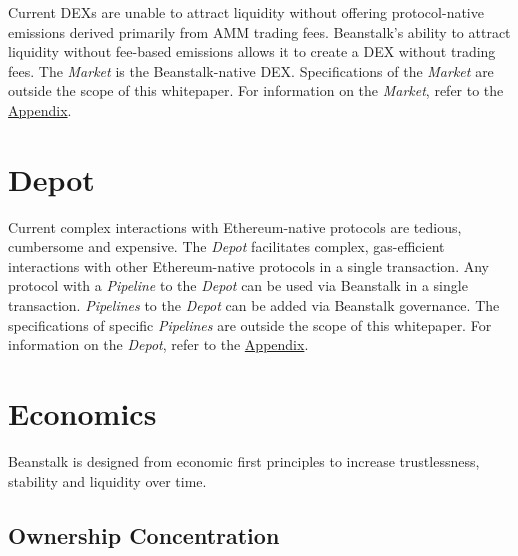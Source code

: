\documentclass[tikz]{article}
\newcommand{\term}[1]{\textsl{#1}}
\begin{document}
Current DEXs are unable to attract liquidity without offering protocol-native emissions derived primarily from AMM trading fees. Beanstalk's ability to attract liquidity without fee-based emissions allows it to create a DEX without trading fees. The \term{Market} is the Beanstalk-native DEX. Specifications of the \term{Market} are outside the scope of this whitepaper. For information on the \term{Market}, refer to the \hyperlink{section.14}{Appendix}.


\section{Depot}

Current complex interactions with Ethereum-native protocols are tedious, cumbersome and expensive. The \term{Depot} facilitates complex, gas-efficient interactions with other Ethereum-native protocols in a single transaction. Any protocol with a \term{Pipeline} to the \term{Depot} can be used via Beanstalk in a single transaction. \term{Pipelines} to the \term{Depot} can be added via Beanstalk governance. The specifications of specific \term{Pipelines} are outside the scope of this whitepaper. For information on the \term{Depot}, refer to the \hyperlink{section.14}{Appendix}.


\section{Economics}

Beanstalk is designed from economic first principles to increase trustlessness, stability and liquidity over time.


\subsection{Ownership Concentration}
\end{document}
